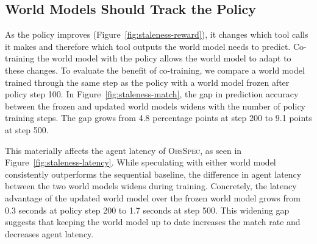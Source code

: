 \documentclass{article} %
\newcommand{\method}{\textsc{ObsSpec}}
\begin{document}
\subsection{World Models Should Track the Policy}
\label{sec:staleness-results}

As the policy improves (Figure~\ref{fig:staleness-reward}), it changes which tool calls it makes and therefore which tool outputs the world model needs to predict. Co-training the world model with the policy allows the world model to adapt to these changes. To evaluate the benefit of co-training, we compare a world model trained through the same step as the policy with a world model frozen after policy step 100. In Figure~\ref{fig:staleness-match}, the gap in prediction accuracy between the frozen and updated world models widens with the number of policy training steps. The gap grows from 4.8 percentage points at step 200 to 9.1 points at step 500.

This materially affects the agent latency of \method, as seen in Figure~\ref{fig:staleness-latency}. While speculating with either world model consistently outperforms the sequential baseline, the difference in agent latency between the two world models widens during training. Concretely, the latency advantage of the updated world model over the frozen world model grows from 0.3 seconds at policy step 200 to 1.7 seconds at step 500. This widening gap suggests that keeping the world model up to date increases the match rate and decreases agent latency.
\end{document}
